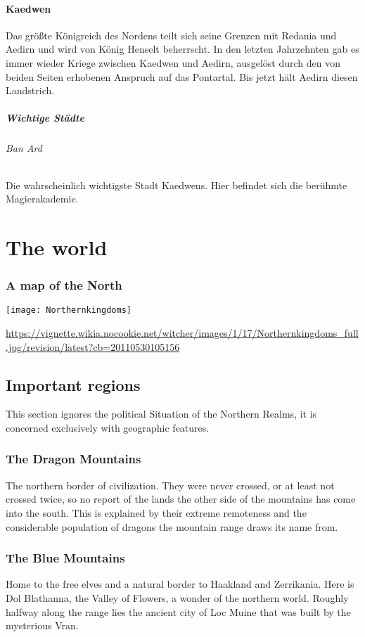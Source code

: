 \documentclass[parskip=full,11pt,%
footheight=38pt]{scrreport}
\begin{document}
	\subsubsection{Kaedwen}
	Das größte Königreich des Nordens teilt sich seine Grenzen mit Redania und Aedirn und wird von König Henselt beherrscht. In den letzten Jahrzehnten gab es immer wieder Kriege zwischen Kaedwen und Aedirn, ausgelöst durch den von beiden Seiten erhobenen Anspruch auf das Pontartal. Bis jetzt hält Aedirn diesen Landstrich.
	\paragraph{Wichtige Städte}
	\subparagraph{Ban Ard}
	Die wahrscheinlich wichtigste Stadt Kaedwens. Hier befindet sich die berühmte Magierakademie.
\fi

\chapter{The world}

\subsection{A map of the North}
\begin{center}
	\texttt{[image: Northernkingdoms]}
	\begin{tiny}\url{https://vignette.wikia.nocookie.net/witcher/images/1/17/Northernkingdoms_full.jpg/revision/latest?cb=20110530105156}\end{tiny}
\end{center}

\section{Important regions}\label{region:dragonMtns}
This section ignores the political Situation of the Northern Realms, it is concerned exclusively with geographic features.
\subsection{The Dragon Mountains}
The northern border of civilization. They were never crossed, or at least not crossed twice, so no report of the lands the other side of the mountains has come into the south.
This is explained by their extreme remoteness and the considerable population of dragons the mountain range draws its name from.

\subsection{The Blue Mountains}\label{region:blueMtns}
Home to the free elves and a natural border to Haakland and Zerrikania. Here is Dol Blathanna, the Valley of Flowers, a wonder of the northern world.
Roughly halfway along the range lies the ancient city of Loc Muine that was built by the mysterious Vran.
\end{document}
